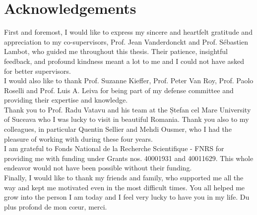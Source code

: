 \chapter*{Acknowledgements}

First and foremost, I would like to express my sincere and heartfelt gratitude and appreciation to my co-supervisors, Prof. Jean Vanderdonckt and Prof. S\'ebastien Lambot, who guided me throughout this thesis. Their patience, insightful feedback, and profound kindness meant a lot to me and I could not have asked for better supervisors.
\\

I would also like to thank Prof. Suzanne Kieffer, Prof. Peter Van Roy, Prof. Paolo Roselli and Prof. Luis A. Leiva for being part of my defense committee and providing their expertise and knowledge.
\\

Thank you to Prof. Radu Vatavu and his team at the Ștefan cel Mare University of Suceava who I was lucky to visit in beautiful Romania.
Thank you also to my colleagues, in particular Quentin Sellier and Mehdi Ousmer, who I had the pleasure of working with during these four years.
\\

I am grateful to Fonds National de la Recherche Scientifique - FNRS for providing me with funding under Grants nos. 40001931 and 40011629. This whole endeavor would not have been possible without their funding.
\\

Finally, I would like to thank my friends and family, who supported me all the way and kept me motivated even in the most difficult times. You all helped me grow into the person I am today and I feel very lucky to have you in my life. Du plus profond de mon c\oe{}ur, merci.